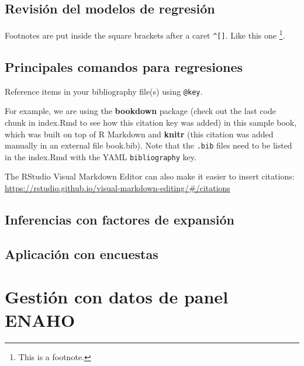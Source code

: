 \documentclass[
]{book}
\theoremstyle{definition}
\theoremstyle{definition}
\theoremstyle{definition}
\theoremstyle{definition}
\theoremstyle{remark}
\begin{document}
\hypertarget{revisiuxf3n-del-modelos-de-regresiuxf3n}{%
\section{Revisión del modelos de regresión}\label{revisiuxf3n-del-modelos-de-regresiuxf3n}}

Footnotes are put inside the square brackets after a caret \texttt{\^{}{[}{]}}. Like this one \footnote{This is a footnote.}.

\hypertarget{principales-comandos-para-regresiones}{%
\section{Principales comandos para regresiones}\label{principales-comandos-para-regresiones}}

Reference items in your bibliography file(s) using \texttt{@key}.

For example, we are using the \textbf{bookdown} package \citep{R-bookdown} (check out the last code chunk in index.Rmd to see how this citation key was added) in this sample book, which was built on top of R Markdown and \textbf{knitr} \citep{xie2015} (this citation was added manually in an external file book.bib).
Note that the \texttt{.bib} files need to be listed in the index.Rmd with the YAML \texttt{bibliography} key.

The RStudio Visual Markdown Editor can also make it easier to insert citations: \url{https://rstudio.github.io/visual-markdown-editing/\#/citations}

\hypertarget{inferencias-con-factores-de-expansiuxf3n}{%
\section{Inferencias con factores de expansión}\label{inferencias-con-factores-de-expansiuxf3n}}

\hypertarget{aplicaciuxf3n-con-encuestas}{%
\section{Aplicación con encuestas}\label{aplicaciuxf3n-con-encuestas}}

\hypertarget{gestiuxf3n-con-datos-de-panel-enaho}{%
\chapter{Gestión con datos de panel ENAHO}\label{gestiuxf3n-con-datos-de-panel-enaho}}
\end{document}
